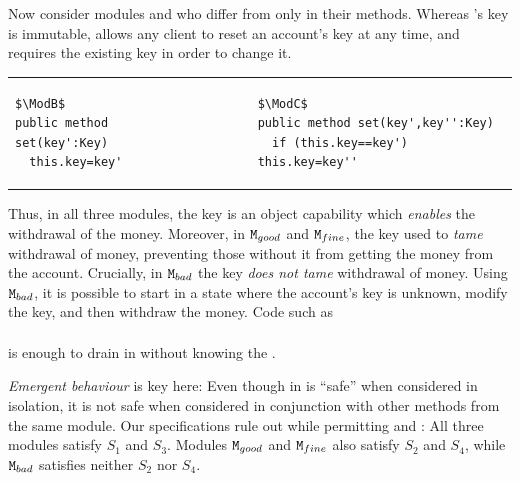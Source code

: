\begin{example}
Now consider  modules \ModB and \ModC who differ from \ModA only in their  methods. Whereas \ModA 's key is immutable, \ModB allows any client to reset an account's key at any time, and \ModC requires the existing key in order to change it.
  

\begin{tabular}{lll}
\begin{minipage}[b]{0.40\textwidth}

\begin{lstlisting}[mathescape=true, language=Chainmail, frame=lines]
$\ModB$
public method set(key':Key)
  this.key=key'
\end{lstlisting}
\end{minipage}
&\ \ \  \ \   &%
\begin{minipage}[b]{0.48\textwidth}
\begin{lstlisting}[mathescape=true, language=chainmail, frame=lines]
$\ModC$
public method set(key',key'':Key)
  if (this.key==key')  this.key=key''
\end{lstlisting}
\end{minipage} 
\end{tabular}

{Thus, in all three modules, the key is an object capability which \emph{enables} the withdrawal of the money. 
Moreover, in $\mbox{\normalfont{\texttt{M}}}_{{good}}$ and $\mbox{\normalfont{\texttt{M}}}_{{fine}}$, the key
 used to  \emph{tame} withdrawal of money, preventing those without it from getting the money from the account.}
Crucially,  in $\mbox{\normalfont{\texttt{M}}}_{{bad}}$ the key \emph{does not tame} withdrawal of money.
Using $\mbox{\normalfont{\texttt{M}}}_{{bad}}$, it is possible to start in a state where the account's key is unknown, modify the key, and then withdraw the money. 
Code  {such as}
\\ 
$\ \strut \hspace{.2in} $  
\\ 
is enough to drain   in \ModB without knowing the \password.
 
 \emph{Emergent behaviour} is key here: 
Even though %
 in  \ModB is ``safe'' when considered in isolation, it is not safe when considered in conjunction with other methods from the same module. 
Our  specifications  rule  out \ModB while permitting \ModA and
\ModC:
All three modules satisfy $S_1$ and $S_3$. Modules $\mbox{\normalfont{\texttt{M}}}_{{good}}$ and $\mbox{\normalfont{\texttt{M}}}_{{fine}}$ also satisfy $S_2$ and $S_4$, while $\mbox{\normalfont{\texttt{M}}}_{{bad}}$ satisfies neither $S_2$ nor $S_4$.
\end{example}
 
